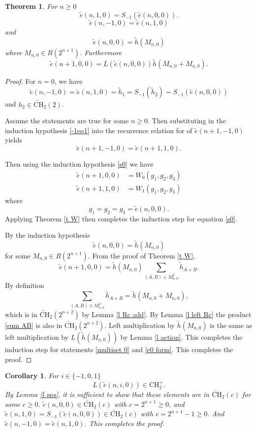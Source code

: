 \documentclass[11pt, oneside]{article}   	%
\newtheorem{theorem}{Theorem}
\newtheorem{corollary}{Corollary}
\newcommand{\ti}{\tilde{h}}
\newcommand{\tCH}{\tilde{\mathrm{CH}}_2}
\newcommand{\CH}{\mathrm{CH}_2}
\newcommand{\te}{\tilde{e}}
\begin{document}
\begin{theorem} \label{t 0 main}
For $n \geq 0$
\begin{equation} \label{s0}
\te(n,1,0) = S_{-1}(\te(n,0,0)).
\end{equation}
\begin{equation} \label{-1eq1}
\te(n,-1,0) = \te(n,1,0)
\end{equation}
and
\begin{equation} \label{multiset 0}
\te(n,0,0)   = \ti(M_{n,0})
\end{equation}
where $M_{n,0} \in R(2^{n+1})$. 
Furthermore
\begin{equation} \label{e0 form}
\te(n+1,0,0) = L(\te(n,0,0)) \ti(M_{n,0} + M_{n,0}).
\end{equation}


\end{theorem}
\begin{proof}
 For $n=0$, we have 
 \[
 \te(n,-1,0) = \te(n,1,0)  = \ti_1 = S_{-1}(\ti_2)= S_{-1}( \te(n,0,0)) 
 \]
 and $h_2 \in \tCH(2)$.

Assume the statements are true for some $n \geq 0$. Then substituting in the induction hypothesis \eqref{-1eq1} into the recurrence relation for of $\te(n+1,-1,0)$ yields 
\[
\te(n+1,-1,0) = \te(n+1,1,0). 
\]

Then using the induction hypothesis \eqref{s0} we have
\begin{align*}
\te(n+1,0,0) &=  W_0(g_1,g_2,g_3)\\ 
\te(n+1,1,0) &= W_1(g_1,g_2,g_3)
\end{align*}
where 
\[
g_1 = g_2=g_3 =  \te(n,0,0).
\]
Applying Theorem \ref{t W} then completes the induction step for equation \eqref{s0}. 

By the induction hypothesis
\[
\te(n,0,0) = \ti(M_{n,0})
\]
for some $M_{n,0} \in R(2^{n+1})$.
From the proof of Theorem \ref{t W}, 
 \begin{equation} \label{sum AB}
\te(n+1,0,0) = \ti(M_{n,0}) \sum_{(A,B) \in M_{n,0}^2} \ti_{A+B}.
 \end{equation}
By definition 
 \[
 \sum_{(A,B) \in M_{n,0}^2} \ti_{A+B}=\ti(M_{n,0}+M_{n,0}),
 \]
which is in $\tCH(2^{n+2})$ by Lemma \ref{l Rc add}. By Lemma \ref{l left Rc} the product \eqref{sum AB} is also in $\tCH(2^{n+2})$. Left multiplication by $\ti(M_{n,0})$ is the same as left multiplication by $L(\ti(M_{n,0}) )$ by Lemma \ref{l action}. This completes the induction step for statements \eqref{multiset 0} and \eqref{e0 form}.
This completes the proof. 
\end{proof}
\begin{corollary} 
For $i\in \{-1,0,1\}$
\begin{equation}
L(\te(n,i,0)) \in \CH^+.
\end{equation}
By Lemma \ref{l pos}, it is sufficient to show that these elements are in $\tCH(c)$ for some $c \geq 0$. $\te(n,0,0) \in \tCH(c)$ with $c = 2^{n+1}\geq 0$, and $\te(n,1,0) = S_{-1}(\te(n,0,0)) \in \tCH(c)$ with $c = 2^{n+1}-1\geq 0$. And $\te(n,-1,0) = \te(n,1,0)$. This completes the proof. 

\end{corollary} 
\end{document}
